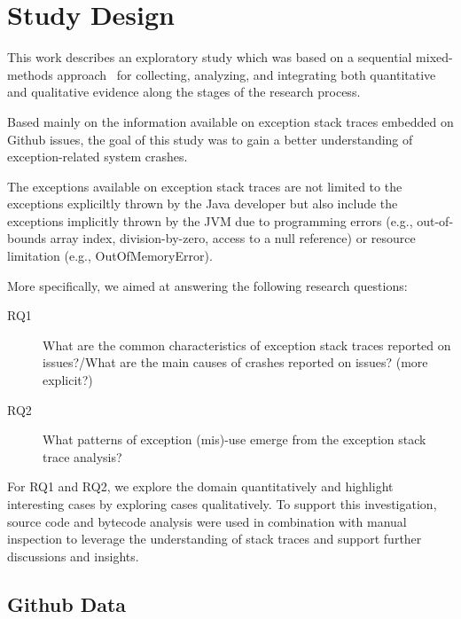 \documentclass[conference]{IEEEtran}
\begin{document}
\section{Study Design}

This work describes an exploratory study which was based on a sequential
mixed-methods approach~\cite{ivankova2006using} for collecting, analyzing, and
integrating both quantitative and qualitative evidence along the stages of the
research process. 

Based mainly on the information available on exception stack traces embedded 
on Github issues, the goal of this study was to gain a better understanding 
of exception-related system crashes.

The exceptions available on exception stack traces are not limited to the exceptions 
expliciltly thrown by the Java developer but also include
the exceptions implicitly thrown by the JVM due to programming errors (e.g., out-of-bounds array index, division-by-zero, 
access to a null reference) or resource limitation (e.g., OutOfMemoryError). 

 More specifically, we aimed at answering
the following research questions:

\begin{description}

  \item[RQ1] What are the common characteristics of exception stack traces reported on issues?/What are the main causes of crashes reported on issues? (more explicit?)

  \item[RQ2] What patterns of exception (mis)-use emerge from the exception stack trace
    analysis?

\end{description}

For RQ1 and RQ2, we explore the domain quantitatively and highlight interesting cases by 
exploring cases qualitatively. To support this investigation, source code and bytecode 
analysis were used in combination with manual inspection to leverage the  understanding of stack traces and support further discussions and insights. 

\subsection{Github Data}
\label{sec:git}
\end{document}
